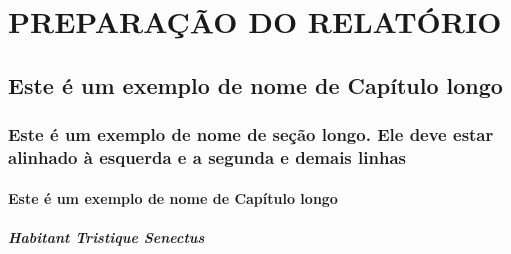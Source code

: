 \documentclass[a4paper,12pt,brazilian,oneside]{Arquivos/Relatorio}
\begin{document}
\begin{resumo}
\lipsum[1]

\end{resumo}



\begin{abstract}
\lipsum[101]

\end{abstract}





\tableofcontents





\textual



\lipsum[101]

\part{PREPARAÇÃO DO RELATÓRIO}

\chapter{Este é um exemplo de nome de Capítulo longo}
\lipsum[101]
\section{Este é um exemplo de nome de seção longo. 
Ele deve estar alinhado à esquerda e a segunda e 
demais linhas}
\lipsum[101]
\subsection{Este é um exemplo de nome de Capítulo longo}
\lipsum[101]
\subsubsection{Habitant Tristique Senectus}
\lipsum[101]
\end{document}
